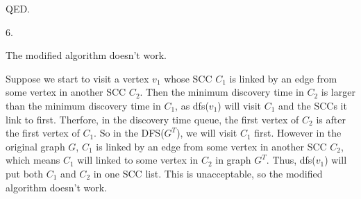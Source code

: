 \documentclass[12pt]{article}
\begin{document}
QED.

6.

The modified algorithm doesn't work. 

Suppose we start to visit a vertex $v_1$ whose SCC $C_1$ 
is linked by an edge from some vertex in another SCC $C_2$. Then the minimum discovery time in $C_2$ is larger than the minimum discovery time in $C_1$, as dfs($v_1$) will visit $C_1$ and the SCCs it link to first. Therfore, in the discovery time queue, the first vertex of $C_2$ is after the first vertex of $C_1$. So in the DFS($G^{T}$), we will visit $C_1$ first. However in the original graph $G$, $C_1$ is linked by an edge from some vertex in another SCC $C_2$, which means $C_1$ will linked to some vertex in $C_2$ in graph $G^{T}$. Thus, dfs($v_1$) will put both $C_1$ and $C_2$ in one SCC list. This is unacceptable, so the modified algorithm doesn't work.
\end{document}
